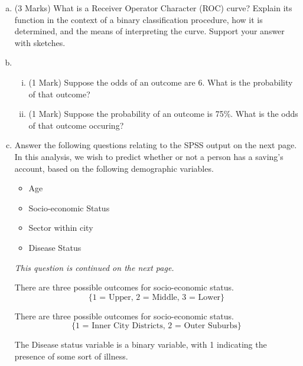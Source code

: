 \begin{enumerate}
\begin{enumerate}[(a)]
			
\medskip
		\item (3 Marks) What is a Receiver Operator Character (ROC) curve? Explain its function in the context of a binary classification procedure, how it is determined, and the means of interpreting the curve. Support your answer with sketches.	
	
\medskip 

\item 
\begin{enumerate}[(i)]
\item (1 Mark) Suppose the odds of an outcome are 6. What is the probability of that outcome?
\item (1 Mark) Suppose the probability of an outcome is 75\%. What is the odds of that outcome occuring?
\end{enumerate}
\medskip

\item Answer the following questions relating to the SPSS output on the next page. In this analysis, we wish to predict whether or not a person has a saving's account, based on the following demographic variables.

\begin{itemize}
	\item Age
	\item Socio-economic Status
	\item Sector within city
	\item Disease Status
\end{itemize}
\noindent \textit{This question is continued on the next page.}


There are three possible outcomes for socio-economic status.
\[\{\mbox{1 = Upper, 2 = Middle, 3 = Lower}\}\]

There are three possible outcomes for socio-economic status.
\[\{\mbox{1 = Inner City Districts, 2 = Outer Suburbs}\}\]

The Disease status variable is a binary variable, with 1 indicating the presence of some sort of illness.







\end{enumerate}
\end{enumerate}
